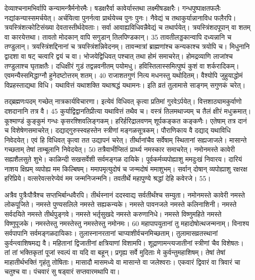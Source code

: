 देव्याश्चनामभिर्वापि कन्यामन्त्रैर्मनोरमैः।
 षडक्षरैर्वा कावेर्यास्तथा लक्ष्मीषडक्षरैः।
 गन्धपुष्पाक्षतफलैः नद्यांकन्यास्समर्चयेत्।
 अर्चयित्वा पुनर्नत्वा प्रार्थयेच्च पुनः पुनः।
 नैवेद्यं च तथाकुर्यान्नानाविध फलैरपि।
 त्रयस्त्रिंशत्कोटिसंख्या देवतास्तीर्थदेवताः।
 सर्वा आवाह्यविधिवन्नैवेद्यं च तथार्पयेत्।
 त्रयस्त्रिंशदपूपान् वा शतम् वा कारयेत्तथा।
 तावतो मोदकान् वापि सगुडान् तिलपिण्डकान्।
 35 तावतीलड्डकान्वापि दध्यन्नानि च तण्डुलान्।
 त्रयस्त्रिंशद्दिनानां च त्रयस्त्रिंशन्निवेदनम्।
 तावन्मात्रां ब्राह्मणांश्च कन्यकाश्च त्रयोपि च।
 मिधुनानि द्वादशा वा षट् चत्वारि द्वयं च वा।
 भोजयेद्विधिवत् पश्चात् तथा होमं समाचरेत्।
 होमद्रव्याणि लाजांश्च तण्डुलाश्च घृताक्षतैः।
 दधिक्षीरं गुडं तद्वन्नवनीतम् पयोमधु।
 हविस्तिलास्समित्पुष्पं कुशं वा शर्करादिकम्।
 एवमन्यैस्समिद्धाग्नौ हुनेदष्टोत्तरम् शतम्।
 40 राजाशतगुणं नित्य मधनस्तु यथोदितम्।
 वैश्योपि जुहुयाद्धोमं विप्रहस्ताद्यथा विधि।
 यथावित्तं यथाशक्ति यथाश्रद्धं यथामनः।
 इति व्रतं तुलामासे साङ्गम् सगुणकं चरेत्।
 
तद्ब्रह्मणःपदम् गच्छेत् नात्रकार्यविचारणा।
 इत्येवं विधिवत् कृत्वा प्रतिमां गुरवेऽर्पयेत्।
 वित्तशाठ्यामकुर्वाणो दशदानानि तत्र वै।
 45 कुर्याद्विद्वानतिप्रीत्या यथावित्तं तथैव च।
 वस्त्रं तिलमथाज्यम् च तैलं क्षीरं मधुक्रमात्।
 कूश्माण्डं कुङ्कुमं गन्धः कृसरश्शिवलिङ्गकम्।
 हरिर्हरिद्रालवणम् शूर्पकङ्कत कङ्कणैः।
 एतेषाम् तत्र दानं च विशेषेणसमाचरेत्।
 दद्याद्गुरुस्स्वहस्तेन स्त्रीणां मङ्गळसूत्रकम्।
 पौराणिकाय वै दद्याद् यथाविधि निवेदयेत्।
 एवं हि विधिवत् कृत्वा तत उद्यापनं चरेत्।
 तीर्थानांचैव सर्वेषाम् स्थितानां सह्यजाजले।
 मासान्ते गच्छताम् तेषां ताम्बूलानि निवेदयेत्।
 50 तत्रैवाभीप्सितं प्रार्थ्य नमस्कार समाचरेत्।
 नमोनमस्ते कावेरी सह्यशैलसुते शुभे।
 काळिन्दी सखसर्वेशी सर्वमङ्गळ दायिके।
 पूर्वकर्मव्यपोह्याशु ममदुःखं निवारय।
 दारियं नाशय क्षिप्रम् व्यपोह्य मम किल्बिषम्।
 ममापमृत्युदोषं च जन्मदोषं ममाशुभम्।
 सर्वान् दोषान् व्यपोह्याशु रक्षरक्ष हरिप्रिये।
 वत्सरेवत्सरेप्येवं मम जन्मनिजन्मनि।
 तवतीर्थे महापुण्ये श्रद्धां देहि कवेरजे।
 55।

अत्रैव पुत्रैःपौत्रैश्च सप्तभिर्बान्धवैरपि।
 तीर्थस्नानं ददस्वाद्य सर्वतीर्थंश्च सम्युता।
 नमोनमस्ते कावेरी नमस्ते लोकपूजिते।
 नमस्ते पुण्यसलिले नमस्ते सह्यकन्यके।
 नमस्ते पावनजले नमस्ते कलिनाशिनी।
 नमस्ते सर्वदयिते नमस्ते तीर्थपुङ्गवे।
 नमस्ते भर्तृसुखदे नमस्ते करुणानिधे।
 नमस्ते विष्णुमहिते नमस्ते विष्णुपूजके।
 नमस्तेस्तु नमस्तेस्तु नमस्तेस्तु नमोनमः।
 60 महापापयुतानां तु महादोषोत्थजन्मनाम्।
 विनाश्य सर्वपापानि सर्वमङ्गळदायिकाः।
 तुलास्नानरतानां चाप्याशीर्वचनमिच्छताम्।
 तुलामासव्रतस्थानां कुर्वन्त्वाशिषमद्य वै।
 महितानां द्विजातीनां क्षत्रियाणां विशामपि।
 शूद्राणामन्त्यजातीनां स्त्रीणां चैव विशेषतः।
 तां तां भक्तिकृतां पूजां स्वल्पं वा यदि वा बहून्।
 प्रगृह्य सर्वे मुदिताः मे कुर्वन्तुमहाशिषम्।
 तेषां तेषां माहातीर्थभक्तिं गृहंतु तोषिताः।
 मासादौ मासमध्ये वा मासान्ते वा जलेश्वराः।
 एकवारं द्विवारं वा त्रिवारं चा चतुश्च वा।
 पंचवारं सु षड्वारं सप्तवारमथापि वा।
 
